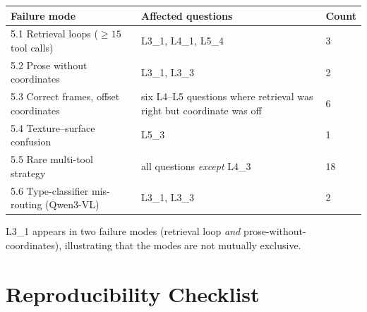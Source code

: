\documentclass[12pt,letterpaper,oneside]{article}
\begin{document}
\begin{center}
\small
\begin{tabularx}{\textwidth}{@{}lXl@{}}
\toprule
Failure mode & Affected questions & Count \\
\midrule
5.1 Retrieval loops ($\ge15$ tool calls) & L3\_1, L4\_1, L5\_4 & 3 \\
5.2 Prose without coordinates & L3\_1, L3\_3 & 2 \\
5.3 Correct frames, offset coordinates & six L4--L5 questions where retrieval was right but coordinate was off & 6 \\
5.4 Texture--surface confusion & L5\_3 & 1 \\
5.5 Rare multi-tool strategy & all questions \emph{except} L4\_3 & 18 \\
5.6 Type-classifier mis-routing (Qwen3-VL) & L3\_1, L3\_3 & 2 \\
\bottomrule
\end{tabularx}
\end{center}

L3\_1 appears in two failure modes (retrieval loop \emph{and}
prose-without-coordinates), illustrating that the modes are not
mutually exclusive.

\section{Reproducibility Checklist}\label{app:repro_checklist}
\end{document}

